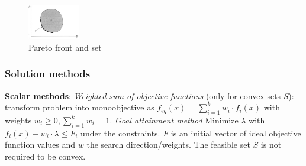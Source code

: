 \begin{figure}[htb]
    \centering
    \includegraphics[width=0.2\textwidth]{img/pareto.jpg}
    \caption{Pareto front and set}
    \label{fig:pareto}
\end{figure}

\subsubsection*{Solution methods}
\textbf{Scalar methods}: 
\textit{Weighted sum of objective functions} (only for convex sets $S$): transform problem into monoobjective as $f_{eq}(x) = \sum_{i=1}^k w_i \cdot f_i(x)$ with weights $w_i \geq 0, \sum_{i=1}^k w_i = 1$. 
\textit{Goal attainment method} 
Minimize $\lambda$ with $f_i (x) - w_i \cdot \lambda \leq F_i$ under the constraints. 
$F$ is an initial vector of ideal objective function values and $w$ the search direction/weights. 
The feasible set $S$ is not required to be convex.

